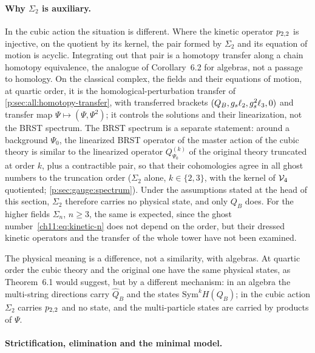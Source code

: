 \paragraph{Why $\Sigma_2$ is auxiliary.}

In the cubic action the situation is different.
Where the kinetic operator $p_{2,2}$ is injective, on the quotient by its kernel, the pair formed by $\Sigma_2$ and its equation of motion is acyclic.
Integrating out that pair is a homotopy transfer along a chain homotopy equivalence, the analogue of Corollary~6.2 for \Loo{} algebras, not a passage to homology.
On the classical complex, the fields and their equations of motion, at quartic order, it is the homological-perturbation transfer of \cref{p:sec:all:homotopy-transfer}, with transferred brackets $(Q_B, g_s \ell_2, g_s^2 \ell_3, 0)$ and transfer map $\Psi \mapsto (\Psi, \Psi^2)$; it controls the solutions and their linearization, not the BRST spectrum.
The BRST spectrum is a separate statement: around a background $\Psi_0$, the linearized BRST operator of the master action of the cubic theory is similar to the linearized operator $Q^{(k)}_{\Psi_0}$ of the original theory truncated at order $k$, plus a contractible pair, so that their cohomologies agree in all ghost numbers to the truncation order ($\Sigma_2$ alone, $k \in \{2, 3\}$, with the kernel of $\mathcal{V}_{4}$ quotiented; \cref{p:sec:gauge:spectrum}).
Under the assumptions stated at the head of this section, $\Sigma_2$ therefore carries no physical state, and only $Q_B$ does.
For the higher fields $\Sigma_n$, $n \ge 3$, the same is expected, since the ghost number~\eqref{ch11:eq:kinetic-n} does not depend on the order, but their dressed kinetic operators and the transfer of the whole tower have not been examined.

The physical meaning is a difference, not a similarity, with \IBL{} algebras.
At quartic order the cubic theory and the original one have the same physical states, as Theorem~6.1 would suggest, but by a different mechanism: in an \IBL{} algebra the multi-string directions carry $\hat{Q}_B$ and the states $\mathrm{Sym}^k H(Q_B)$; in the cubic action $\Sigma_2$ carries $p_{2,2}$ and no state, and the multi-particle states are carried by products of $\Psi$.

\paragraph{Strictification, elimination and the minimal model.}

